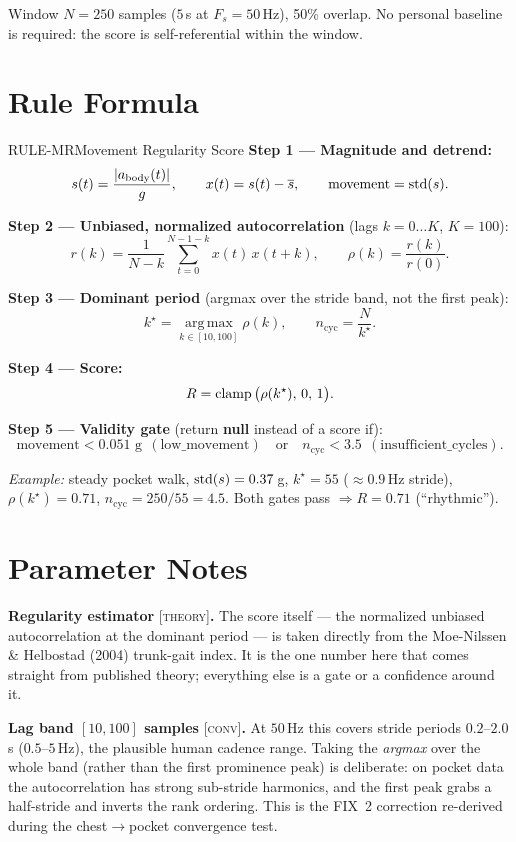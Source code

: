 \noindent Window $N = 250$ samples ($5$\,s at $F_s = 50$\,Hz), 50\% overlap. No personal
baseline is required: the score is self-referential within the window.

\section{Rule Formula}

\begin{rulebox}{RULE-MR}{Movement Regularity Score}
\textbf{Step 1 --- Magnitude and detrend:}
\[ s(t) = \frac{|a_\text{body}(t)|}{g}, \qquad x(t) = s(t) - \overline{s}, \qquad
   \text{movement} = \operatorname{std}(s). \]

\textbf{Step 2 --- Unbiased, normalized autocorrelation} (lags $k = 0\dots K$, $K=100$):
\[ r(k) = \frac{1}{N-k}\sum_{t=0}^{N-1-k} x(t)\,x(t+k), \qquad
   \rho(k) = \frac{r(k)}{r(0)}. \]

\textbf{Step 3 --- Dominant period} (argmax over the stride band, not the first peak):
\[ k^\star = \operatorname*{arg\,max}_{k\in[10,100]} \rho(k), \qquad
   n_\text{cyc} = \frac{N}{k^\star}. \]

\textbf{Step 4 --- Score:}
\[ R = \operatorname{clamp}\big(\rho(k^\star),\,0,\,1\big). \]

\textbf{Step 5 --- Validity gate} (return \textbf{null} instead of a score if):
\[ \text{movement} < 0.051\text{ g}\ \ (\text{low\_movement}) \quad\text{or}\quad
   n_\text{cyc} < 3.5\ \ (\text{insufficient\_cycles}). \]


\smallskip
\textit{Example:} steady pocket walk, $\operatorname{std}(s)=0.37$\,g, $k^\star=55$ ($\approx0.9$\,Hz
stride), $\rho(k^\star)=0.71$, $n_\text{cyc}=250/55=4.5$. Both gates pass
$\Rightarrow R = 0.71$ (``rhythmic'').
\end{rulebox}

\section{Parameter Notes}

\noindent\textbf{Regularity estimator} {\footnotesize\textsc{[theory]}}\textbf{.}
The score itself --- the normalized unbiased autocorrelation at the dominant period --- is
taken directly from the Moe-Nilssen \& Helbostad (2004) trunk-gait index. It is the one number
here that comes straight from published theory; everything else is a gate or a confidence
around it.

\noindent\textbf{Lag band $[10,100]$ samples} {\footnotesize\textsc{[conv]}}\textbf{.}
At $50$\,Hz this covers stride periods $0.2$--$2.0$\,s ($0.5$--$5$\,Hz), the plausible human
cadence range. Taking the \emph{argmax} over the whole band (rather than the first
prominence peak) is deliberate: on pocket data the autocorrelation has strong sub-stride
harmonics, and the first peak grabs a half-stride and inverts the rank ordering. This is the
FIX~2 correction re-derived during the chest$\rightarrow$pocket convergence test.


